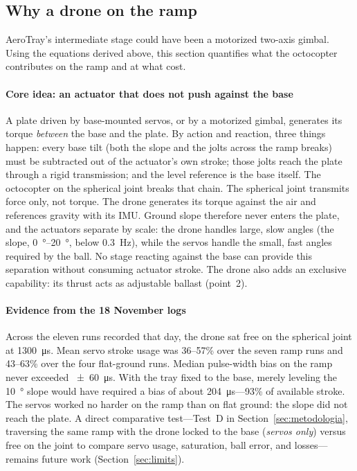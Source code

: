 \subsection{Why a drone on the ramp}
\label{sec:porquedron}

AeroTray's intermediate stage could have been a motorized two-axis gimbal. Using the equations derived above, this section quantifies what the octocopter contributes on the ramp and at what cost.

\paragraph{Core idea: an actuator that does not push against the base}
A plate driven by base-mounted servos, or by a motorized gimbal, generates its torque \emph{between} the base and the plate. By action and reaction, three things happen: every base tilt (both the slope and the jolts across the ramp breaks) must be subtracted out of the actuator's own stroke; those jolts reach the plate through a rigid transmission; and the level reference is the base itself. The octocopter on the spherical joint breaks that chain. The spherical joint transmits force only, not torque. The drone generates its torque against the air and references gravity with its IMU. Ground slope therefore never enters the plate, and the actuators separate by scale: the drone handles large, slow angles (the slope, \SIrange{0}{20}{\degree}, below \SI{0.3}{\hertz}), while the servos handle the small, fast angles required by the ball. No stage reacting against the base can provide this separation without consuming actuator stroke. The drone also adds an exclusive capability: its thrust acts as adjustable ballast (point~2).

\paragraph{Evidence from the 18 November logs}
Across the eleven runs recorded that day, the drone sat free on the spherical joint at \SI{1300}{\micro\second}. Mean servo stroke usage was 36--57\% over the seven ramp runs and 43--63\% over the four flat-ground runs. Median pulse-width bias on the ramp never exceeded \SI{\pm60}{\micro\second}. With the tray fixed to the base, merely leveling the \SI{10}{\degree} slope would have required a bias of about \SI{204}{\micro\second}---93\% of available stroke. The servos worked no harder on the ramp than on flat ground: the slope did not reach the plate. A direct comparative test---Test~D in Section~\ref{sec:metodologia}, traversing the same ramp with the drone locked to the base (\emph{servos only}) versus free on the joint to compare servo usage, saturation, ball error, and losses---remains future work (Section~\ref{sec:limits}).


